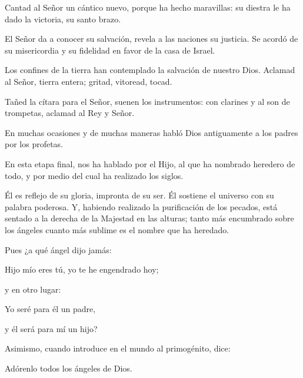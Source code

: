 			\begin{psbody}
				Cantad al Señor un cántico nuevo,
				porque ha hecho maravillas:
				su diestra le ha dado la victoria,
				su santo brazo.
				
				El Señor da a conocer su salvación,
				revela a las naciones su justicia.
				Se acordó de su misericordia y su fidelidad
				en favor de la casa de Israel.
				
				Los confines de la tierra han contemplado
				la salvación de nuestro Dios.
				Aclamad al Señor, tierra entera;
				gritad, vitoread, tocad.
				
				Tañed la cítara para el Señor,
				suenen los instrumentos:
				con clarines y al son de trompetas,
				aclamad al Rey y Señor.
			\end{psbody}
	
		
		 
		
		
			\begin{scripture}
				En muchas ocasiones y de muchas maneras habló Dios antiguamente a los padres por los profetas.
				
				En esta etapa final, nos ha hablado por el Hijo, al que ha nombrado heredero de todo, y por medio del cual ha realizado los siglos.
				
				Él es reflejo de su gloria, impronta de su ser. Él sostiene el universo con su palabra poderosa. Y, habiendo realizado la purificación de los pecados, está sentado a la derecha de la Majestad en las alturas; tanto más encumbrado sobre los ángeles cuanto más sublime es el nombre que ha heredado.
				
				Pues ¿a qué ángel dijo jamás: 
				
				Hijo mío eres tú, yo te he engendrado hoy;
				
				y en otro lugar:
				
				\begin{readprose}
					Yo seré para él un padre,
					
					y él será para mí un hijo?
				\end{readprose}
			
			Asimismo, cuando introduce en el mundo al primogénito, dice:
			
			Adórenlo todos los ángeles de Dios.
		\end{scripture}
	
